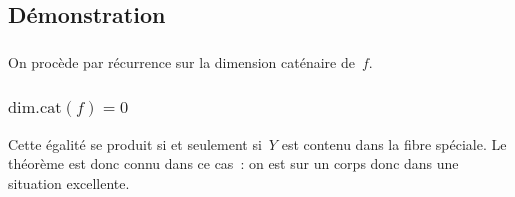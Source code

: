 \documentclass[10pt]{../fichiers-configuration-latex/smfart}
\begin{document}
\subsection{Démonstration}

\subsubsection{}On procède par récurrence sur la dimension caténaire de $f$.

\subsubsection{$\mathrm{dim.cat}(f)=0$} Cette égalité
se produit si et seulement si $Y$ est contenu dans la fibre spéciale. Le théorème
est donc connu dans ce cas : on est sur un corps
donc dans une situation excellente.
\end{document}

